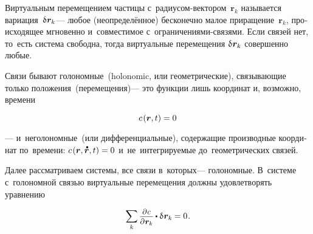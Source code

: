 \begin{otherlanguage}{russian}

Виртуальным перемещением частицы с~радиусом\hbox{-}вектором~${\bm{r}_k}$ называется вариация~${\variation{\hspace{.1ex}\bm{r}_k}}$\:--- %
любое (неопределённое) бесконечно малое приращение~${\bm{r}_k}$, происходящее мгновенно %
и~совместимое с~ограничениями\hbox{-}связями. %
Если связей нет, то~есть система свободна, тогда виртуальные перемещения ${\variation{\hspace{.1ex}\bm{r}_k}}$ совершенно любые.

Связи бывают голономные~(holonomic, или геометрические), связывающие только положения~(перемещения)\:--- это функции лишь координат и, возможно, времени

\nopagebreak\vspace{-0.1em}\begin{equation}\label{holonomicconstraint}
c\hspace{.2ex}(\bm{r}, t) = 0
\end{equation}

\vspace{-0.12em} \noindent --- и~неголономные~(или дифференциальные), содержащие производные координат по~времени: ${c\hspace{.2ex}(\bm{r}, \mathdotabove{\bm{r}}, t) = 0}$ и~не~интегрируемые до~геометрических связей.

Далее рассматриваем системы, все связи в~которых\:--- голономные. В~системе с~голономной связью виртуальные перемещения должны удовлетворять уравнению

\nopagebreak\vspace{-0.1em}\begin{equation}\label{requirementforvirtualdisplacements}
\displaystyle \sum_k \scalebox{0.92}{$\displaystyle \frac{\raisemath{-0.12em}{\partial \hspace{.1ex} c}}{\partial \hspace{.1ex} \bm{r}_k}$} \hspace{-0.1ex} \dotp \variation{\hspace{.1ex}\bm{r}_k} \hspace{-0.1ex} = 0 \hspace{.16ex}.
\vspace{-0.25em}\end{equation}


\end{otherlanguage}
